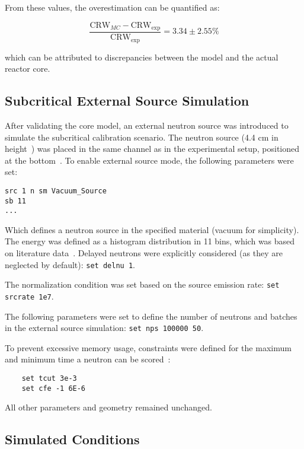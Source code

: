 From these values, the overestimation can be quantified as:

\begin{equation}
\frac{\text{CRW}_{MC} - \text{CRW}_{\text{exp}}}{\text{CRW}_{\text{exp}}} = 3.34 \pm 2.55 \%
\end{equation}

which can be attributed to discrepancies between the model and the actual reactor core.

\subsection{Subcritical External Source Simulation}

After validating the core model, an external neutron source was introduced to simulate the subcritical calibration scenario. The neutron source (4.4 cm in height~\cite{Ponciroli2010}) was placed in the same channel as in the experimental setup, positioned at the bottom~\cite{Ponciroli2010}. To enable external source mode, the following parameters were set:
\begin{lstlisting}
src 1 n sm Vacuum_Source
sb 11
...
\end{lstlisting}

Which defines a neutron source in the specified material (vacuum for simplicity).
The energy was defined as a histogram distribution in 11 bins, which was based on literature data~\cite{Geiger1964}.
Delayed neutrons were explicitly considered (as they are neglected by default): \texttt{set delnu 1}.

The normalization condition was set based on the source emission rate: \texttt{set srcrate 1e7}.

The following parameters were set to define the number of neutrons and batches in the external source simulation: \texttt{set nps 100000 50}.

To prevent excessive memory usage, constraints were defined for the maximum and minimum time a neutron can be scored~\cite{SerpentMC2013}:

\begin{lstlisting}
    set tcut 3e-3
    set cfe -1 6E-6
\end{lstlisting}

All other parameters and geometry remained unchanged.

\subsection{Simulated Conditions}

